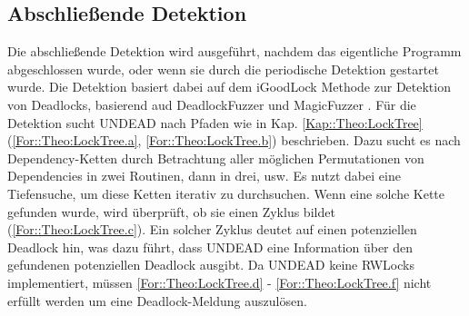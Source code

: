 \subsection{Abschließende Detektion} \label{Kap::UNDEAD:Abschließende}
Die abschließende Detektion wird ausgeführt, nachdem das eigentliche Programm
abgeschlossen wurde, oder wenn sie durch die periodische Detektion gestartet wurde.
Die Detektion basiert dabei auf dem iGoodLock Methode 
zur Detektion von Deadlocks, basierend aud DeadlockFuzzer \cite{Joshi} und 
MagicFuzzer \cite{Cai}. Für die Detektion sucht UNDEAD nach Pfaden wie in Kap.
\ref{Kap::Theo:LockTree} (\eqref{For::Theo:LockTree.a}, \eqref{For::Theo:LockTree.b})
beschrieben. Dazu sucht es nach Dependency-Ketten 
durch Betrachtung aller möglichen Permutationen von Dependencies in zwei Routinen, dann 
in drei, usw. Es nutzt dabei 
eine Tiefensuche, um diese Ketten iterativ zu durchsuchen. Wenn eine solche Kette 
gefunden wurde, wird überprüft, ob sie einen Zyklus bildet 
(\eqref{For::Theo:LockTree.c}).
Ein solcher Zyklus deutet auf einen potenziellen Deadlock hin, was dazu 
führt, dass UNDEAD eine Information über den gefundenen potenziellen Deadlock ausgibt.
Da UNDEAD keine RWLocks implementiert, müssen \eqref{For::Theo:LockTree.d}
- \eqref{For::Theo:LockTree.f} nicht erfüllt werden um eine Deadlock-Meldung
auszulösen.


